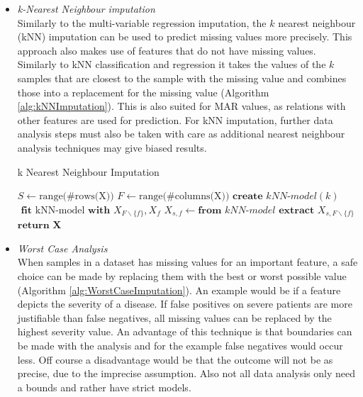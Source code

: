 \documentclass[10pt,a4paper]{report}
\begin{document}
\begin{itemize}
		\item \textit{k-Nearest Neighbour imputation} \\
		Similarly to the multi-variable regression imputation, the $k$ nearest neighbour (kNN) imputation can be used to predict missing values more precisely. This approach also makes use of features that do not have missing values. Similarly to kNN classification and regression it takes the values of the $k$ samples that are closest to the sample with the missing value and combines those into a replacement for the missing value (Algorithm \ref{alg:kNNImputation}). This is also suited for MAR values, as relations with other features are used for prediction\cite{myrtveit2001analyzing, cartwright2003dealing}. For kNN imputation, further data analysis steps must also be taken with care as additional nearest neighbour analysis techniques may give biased results\cite{donders2006gentle}.
		
		\begin{algorithm}[H]
			\caption{k Nearest Neighbour Imputation}\label{alg:kNNImputation}
			\begin{algorithmic}[1]
				\State $S \gets \text{range(\#rows(X))}$ 	
				\State $F \gets \text{range(\#columns(X))}$ 	
				 					
				 				 			
				\State $\textbf{create } \textit{kNN-model}(k)$	
				\State $\textbf{ fit } \text{kNN-model} \textbf{ with } X_{F \backslash\{f\}}, X_f$	
				 
				 
				\State $X_{s,f} \gets \textbf{from } \textit{kNN-model} \textbf{ extract } X_{s, F \backslash \{f\}}$ 
				\EndIf
				\EndFor
				\EndIf
				\EndFor
				\State $\textbf{return X}$
				\EndProcedure
			\end{algorithmic}
		\end{algorithm}	
		
		\item \textit{Worst Case Analysis} \\
		When samples in a dataset has missing values for an important feature, a safe choice can be made by replacing them with the best or worst possible value (Algorithm \ref{alg:WorstCaseImputation}). An example would be if a feature depicts the severity of a disease. If false positives on severe patients are more justifiable than false negatives, all missing values can be replaced by the highest severity value. An advantage of this technique is that boundaries can be made with the analysis and for the example false negatives would occur less. Off course a disadvantage would be that the outcome will not be as precise, due to the imprecise assumption. Also not all data analysis only need a bounds and rather have strict models\cite{pedersen2017missing, haukoos2007advanced}.
		

\end{itemize}
\end{document}
